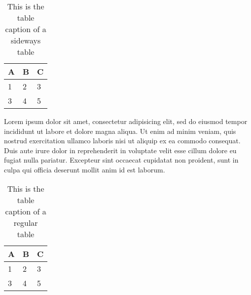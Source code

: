 \begin{sidewaystable}
	\caption[A Table]{This is the table caption of a sideways table}
	\centering
	\begin{tabular}{lll}
		\toprule
		A & B & C \\
		\midrule
		1 & 2 & 3 \\
		3 & 4 & 5 \\
		\bottomrule
	\end{tabular}
	\label{table:abcside}
\end{sidewaystable}

Lorem ipsum dolor sit amet, consectetur adipisicing elit, sed do eiusmod tempor incididunt ut labore et dolore magna aliqua. Ut enim ad minim veniam, quis nostrud exercitation ullamco laboris nisi ut aliquip ex ea commodo consequat. Duis aute irure dolor in reprehenderit in voluptate velit esse cillum dolore eu fugiat nulla pariatur. Excepteur sint occaecat cupidatat non proident, sunt in culpa qui officia deserunt mollit anim id est laborum.

\begin{table}
	\caption[Another Table]{This is the table caption of a regular table}
	\centering
	\begin{tabular}{lll}
		\toprule
		A & B & C \\
		\midrule
		1 & 2 & 3 \\
		3 & 4 & 5 \\
		\bottomrule
	\end{tabular}
	\label{table:abc}
\end{table}


\begin{comment}
	
	{}

	\begin{appendices}
	  \chapter{Appendix to Chapter 1}
	  
	\end{appendices}

	
\end{comment}
